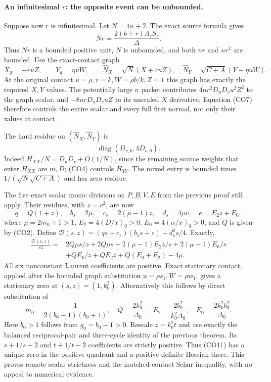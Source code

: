 \paragraph{An infinitesimal $r$: the opposite event can be unbounded.}
Suppose now $r$ is infinitesimal.  Let $N=4n+2$.  The exact source
formula gives
\[
             Nr=\frac{2(b+r)A_cS_c}{\Delta}.             \tag{CO7}
\]
Thus $Nr$ is a bounded positive unit, $N$ is unbounded, and both
$nr$ and $nr^2$ are bounded.  Use the exact-contact graph
\[
 X_g=-ruZ,\qquad Y_g=\eta uW,
 \qquad
 \widehat N_X=\sqrt N(X+ruZ),\quad
 \widehat N_Y=\sqrt{C+A}(Y-\eta uW).                    \tag{CO8}
\]
At the original contact $u=\rho,v=k,W=\rho b/k,Z=1$ this graph
has exactly the required $X,Y$ values.  The potentially large $n$
packet contributes $4nr^2D_uD_vu^2Z^2$ to the graph scalar, and
$-8nrD_uD_vuZ$ to its unscaled $X$ derivative.  Equation (CO7)
therefore controls the entire scalar and every full first normal,
not only their values at contact.

The hard residue on $(\widehat N_X,\widehat N_Y)$ is
\[
                  \operatorname{diag}(D_{v,0},4D_{v,0}). \tag{CO9}
\]
Indeed $H_{XX}/N=D_uD_v+O(1/N)$, since the remaining source
weights that enter $H_{XX}$ are $m,D$; (CO4) controls $H_{YY}$.
The mixed entry is bounded times
$1/(\sqrt N\sqrt{C+A})$ and has zero residue.

The five exact scalar monic divisions on $P,B,V,E$ from the previous
proof still apply.  Their residues, with $z=v^2$, are now
\[
 q=Q(1+z),\quad b_s=2\mu,\quad c_s=2(\mu-1)z,
 \quad d_s=4\mu v,\quad e=E_2z+E_0,                    \tag{CO10}
\]
where $\mu=2m_0+1>1$, $E_2=4(D/x)_0>0$,
$E_0=4(\alpha/x)_0>0$, and $Q$ is given by (CO2).
Define
$\mathcal D(s,z)=(qs+c_s)(b_ss+e)-d_s^2s/4$.
Exactly,
\begin{align*}
 \frac{\mathcal D(s,z)}{sz}={}&
 2Q\mu s/z+2Q\mu s
 +2(\mu-1)E_2z/s+2(\mu-1)E_0/s\\
 &+QE_0/z+QE_2z+Q(E_0+E_2)-4\mu.                    \tag{CO11}
\end{align*}
All six nonconstant Laurent coefficients are positive.  Exact
stationary contact, applied after the bounded graph substitution
$u=\rho s_1,W=\rho w_1$, gives a stationary zero at
$(s,z)=(1,k_0^2)$.  Alternatively this follows by direct substitution
of
\[
 m_0=\frac1{2(b_0-1)(b_0+1)},\quad
 Q=\frac{2k_0^2}{\Delta_0},\quad
 E_2=\frac{2b_0^2}{k_0^2\Delta_0},\quad
 E_0=\frac{2k_0^2b_0^2}{\Delta_0}.
\]
Here $b_0>1$ follows from $g_0=b_0-1>0$.
Rescale $z=k_0^2t$ and use exactly the balanced reciprocal-pair and
three-cycle identity of the previous theorem.  Its $s+1/s-2$ and
$t+1/t-2$ coefficients are strictly positive.  Thus (CO11) has a
unique zero in the positive quadrant and a positive definite Hessian
there.  This proves remote scalar strictness and the matched-contact
Schur inequality, with no appeal to numerical evidence.

